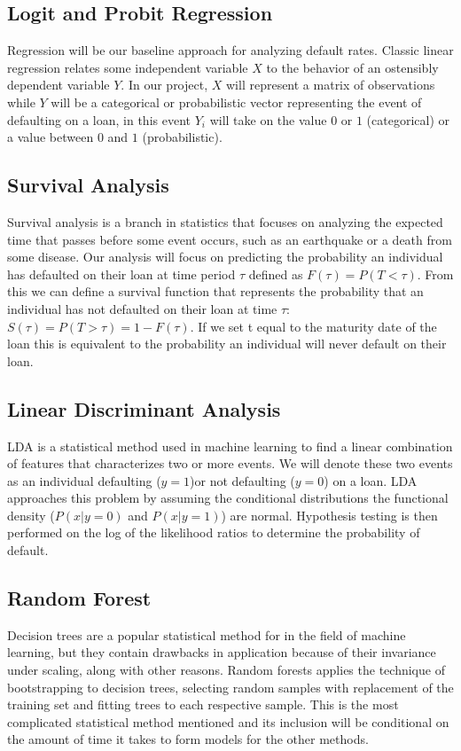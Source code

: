 \documentclass[sigconf, 11pt]{acmart}
\begin{document}
\subsection{Logit and Probit Regression}
Regression will be our baseline approach for analyzing default rates. Classic linear regression relates some independent variable $X$ to the behavior of an ostensibly dependent variable $Y$. In our project, $X$ will represent a matrix of observations while $Y$ will be a categorical or probabilistic vector representing the event of defaulting on a loan, in this event $Y_i$ will take on the value $0$ or $1$ (categorical) or a value between $0$ and $1$ (probabilistic).
\subsection{Survival Analysis}
Survival analysis is a branch in statistics that focuses on analyzing the expected time that passes before some event occurs, such as an earthquake or a death from some disease. Our analysis will focus on predicting the probability an individual has defaulted on their loan at time period $\tau$ defined as $F(\tau) = P(T<\tau)$. From this we can define a survival function that represents the probability that an individual has not defaulted on their loan at time $\tau$: $S(\tau) = P(T>\tau) = 1-F(\tau)$. If we set t equal to the maturity date of the loan this is equivalent to the probability an individual will never default on their loan.
\subsection{Linear Discriminant Analysis}
LDA is a statistical method used in machine learning to find a linear combination of features that characterizes two or more events. We will denote these two events as an individual defaulting ($y=1$)or not defaulting ($y=0$) on a loan. LDA approaches this problem by assuming the conditional distributions the functional density ($P(x|y=0)$ and $P(x|y=1)$) are normal. Hypothesis testing is then performed on the log of the likelihood ratios to determine the probability of default.
\subsection{Random Forest}
Decision trees are a popular statistical method for in the field of machine learning, but they contain drawbacks in application because of their invariance under scaling, along with other reasons. Random forests applies the technique of bootstrapping to decision trees, selecting random samples with replacement of the training set and fitting trees to each respective sample. This is the most complicated statistical method mentioned and its inclusion will be conditional on the amount of time it takes to form models for the other methods.
\end{document}
